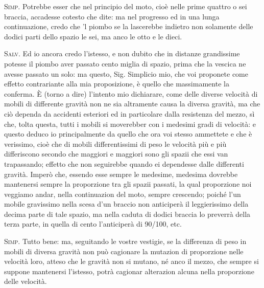 \documentclass[11pt,twoside,openany]{book}
\newcommand{\speaker}[1]{\textcolor{rubric}{\textsc{#1}}\space}
\begin{document}
\speaker{Simp.} Potrebbe esser che nel principio del moto, cioè nelle prime quattro o sei braccia, accadesse cotesto che dite: ma nel progresso ed in una lunga continuazione, credo che 'l piombo se la lascerebbe indietro non solamente delle dodici parti dello spazio le sei, ma anco le otto e le dieci.

\speaker{Salv.} Ed io ancora credo l'istesso, e non dubito che in distanze grandissime potesse il piombo aver passato cento miglia di spazio, prima che la vescica ne avesse passato un solo: ma questo, Sig. Simplicio mio, che voi proponete come effetto contrariante alla mia proposizione, è quello che massimamente la conferma. È (torno a dire) l'intento mio dichiarare, come delle diverse velocità di mobili di differente gravità non ne sia altramente causa la diversa gravità, ma che ciò dependa da accidenti esteriori ed in particolare dalla resistenza del mezzo, sì che, tolta questa, tutti i mobili si moverebber con i medesimi gradi di velocità: e questo deduco io principalmente da quello che ora voi stesso ammettete e che è verissimo, cioè che di mobili differentissimi di peso le velocità più e più differiscono secondo che maggiori e maggiori sono gli spazii che essi van trapassando; effetto che non seguirebbe quando ei dependesse dalle differenti gravità. Imperò che, essendo esse sempre le medesime, medesima dovrebbe mantenersi sempre la proporzione tra gli spazii passati, la qual proporzione noi veggiamo andar, nella continuazion del moto, sempre crescendo; poiché l'un mobile gravissimo nella scesa d'un braccio non anticiperà il leggierissimo della decima parte di tale spazio, ma nella caduta di dodici braccia lo preverrà della terza parte, in quella di cento l'anticiperà di 90/100, etc.

\speaker{Simp.} Tutto bene: ma, seguitando le vostre vestigie, se la differenza di peso in mobili di diversa gravità non può cagionare la mutazion di proporzione nelle velocità loro, atteso che le gravità non si mutano, né anco il mezzo, che sempre si suppone mantenersi l'istesso, potrà cagionar alterazion alcuna nella proporzione delle velocità.
\end{document}
